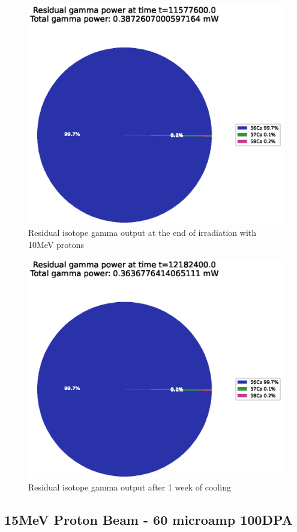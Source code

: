 \begin{figure}[!htb]
\centering
\includegraphics[width=0.7\linewidth]{chapters/activity_code/fe_100dpa/endofbeam/10MeV_0400_11577600.eps}
\caption{Residual isotope gamma output at the end of irradiation with 10MeV protons}
\label{fig:10mev-proton-100dpa}
\end{figure}

\begin{figure}[!htb]
\centering
\includegraphics[width=0.7\linewidth]{chapters/activity_code/fe_100dpa/endofbeam/10MeV_0500_12182400.eps}
\caption{Residual isotope gamma output after 1 week of cooling}
\label{fig:10mev-proton-100dpa}
\end{figure}



\clearpage
\FloatBarrier
\subsection{15MeV Proton Beam - 60 microamp 100DPA}

